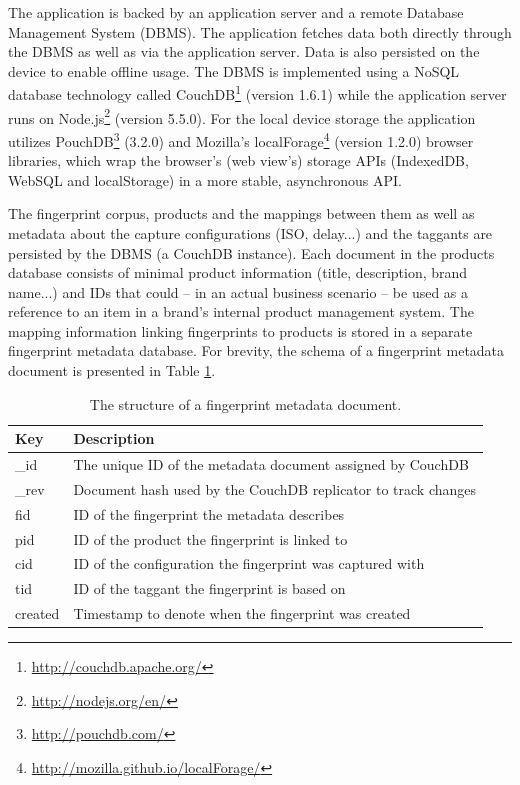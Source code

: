 \documentclass[thesis.tex]{subfiles}
\begin{document}
The application is backed by an application server and a remote Database Management System (DBMS). The application fetches data both directly through the DBMS as well as via the application server. Data is also persisted on the device to enable offline usage. The DBMS is implemented using a NoSQL database technology called CouchDB\footnote{\url{http://couchdb.apache.org/}} (version 1.6.1) while the application server runs on Node.js\footnote{\url{http://nodejs.org/en/}} (version 5.5.0). For the local device storage the application utilizes PouchDB\footnote{\url{http://pouchdb.com/}} (3.2.0) and Mozilla's localForage\footnote{\url{http://mozilla.github.io/localForage/}} (version 1.2.0) browser libraries, which wrap the browser's (web view's) storage APIs (IndexedDB, WebSQL and localStorage) in a more stable, asynchronous API.

The fingerprint corpus, products and the mappings between them as well as metadata about the capture configurations (ISO, delay...) and the taggants are persisted by the DBMS (a CouchDB instance). Each document in the products database consists of minimal product information (title, description, brand name...) and IDs that could -- in an actual business scenario -- be used as a reference to an item in a brand's internal product management system. The mapping information linking fingerprints to products is stored in a separate fingerprint metadata database. For brevity, the schema of a fingerprint metadata document is presented in Table \ref{table:fingerprint-metadata-schema}.

\begin{table}[ht]
	\caption{The structure of a fingerprint metadata document.} \label{table:fingerprint-metadata-schema}

	\begin{center}
	\begin{tabular}{| m{1.25cm} | m{11.5cm} |}

		\hline
		\textbf{Key}	& \textbf{Description} \\ \hline
		\_id			& The unique ID of the metadata document assigned by CouchDB \\
		\hline
		\_rev 			& Document hash used by the CouchDB replicator to track changes \\
		\hline
		fid 			& ID of the fingerprint the metadata describes \\
		\hline
		pid 			& ID of the product the fingerprint is linked to \\
		\hline
		cid 			& ID of the configuration the fingerprint was captured with \\
		\hline
		tid 			& ID of the taggant the fingerprint is based on \\
		\hline
		created			& Timestamp to denote when the fingerprint was created \\
		\hline
	\end{tabular}
	\end{center}
\end{table}
\end{document}
